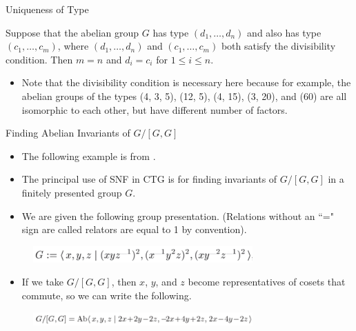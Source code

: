 \documentclass{beamer}
\begin{document}
\begin{frame}{Uniqueness of Type}
    \begin{Theorem}
        Suppose that the abelian group $G$ has type $(d_1,\ldots, d_n)$ and also has type $(c_1,\ldots, c_m)$, where $(d_1,\ldots, d_n)$ and $(c_1,\ldots, c_m)$ both satisfy the divisibility condition. Then $m = n$ and $d_i = c_i$ for $1 \leq i \leq n$.
    \end{Theorem}
    \begin{itemize}
        \item Note that the divisibility condition is necessary here because for example, the abelian groups of the types (4, 3, 5), (12, 5), (4, 15), (3, 20), and (60) are all isomorphic to each other, but have different number of factors.
    \end{itemize}
\end{frame}
\begin{frame}{Finding Abelian Invariants of $G/[G, G]$}
    \begin{itemize}
        \item The following example is from \cite{holt2005handbook}.
        \item The principal use of SNF in CTG is for finding invariants of $G/[G, G]$ in a finitely presented group $G$.
        \item We are given the following group presentation. (Relations without an ``=" sign are called relators are equal to 1 by convention).
    \end{itemize}
    \begin{figure}
        \centering
        \includegraphics[width=0.75\textwidth]{Example.png}
    \end{figure}
    \begin{itemize}
        \item If we take $G/[G, G]$, then $x$, $y$, and $z$ become representatives of cosets that commute, so we can write the following.
    \end{itemize}
    \begin{figure}
        \centering
        \includegraphics[width=0.75\textwidth]{AbelianizedRepresentation.png}
    \end{figure}
\end{frame}
\end{document}
